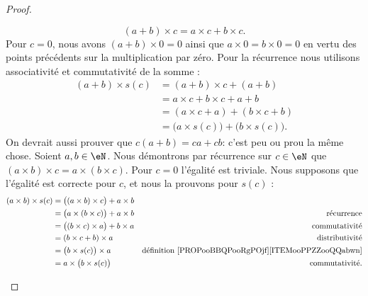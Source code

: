 \begin{proof}
\begin{subproof}
		\begin{equation}
			(a+b)\times c=a\times c+b\times c.
		\end{equation}
		Pour \( c=0\), nous avons \( (a+b)\times 0=0\) ainsi que \( a\times 0=b\times 0=0\) en vertu des points précédents sur la multiplication par zéro. Pour la récurrence nous utilisons associativité et commutativité de la somme :
		\begin{subequations}
			\begin{align}
				(a+b)\times s(c) & =(a+b)\times c+(a+b)                                \\
				                 & =a\times c+b\times c+a+b                            \\
				                 & =(a\times c +a)+(b\times c+b)                       \\
				                 & =\big( a\times s(c) \big)+\big( b\times s(c) \big).
			\end{align}
		\end{subequations}
		On devrait aussi prouver que \( c(a+b) = ca + cb \): c'est peu ou prou la même chose.
		Soient \( a,b\in \eN\). Nous démontrons par récurrence sur \( c\in \eN\) que \( (a\times b)\times c=a\times (b\times c)\). Pour \( c=0\) l'égalité est triviale. Nous supposons que l'égalité est correcte pour \( c\), et nous la prouvons pour \( s(c)\) :
		\begin{subequations}
			\begin{align}
				(a\times b)\times s(c) & =\big( (a\times b)\times c \big)+a\times b                                                                      \\
				                       & =\big( a\times (b\times c) \big)+a\times b & \text{récurrence}                                                  \\
				                       & =\big( (b\times c)\times a \big)+b\times a & \text{commutativité}                                               \\
				                       & =(b\times c+b)\times a                     & \text{distributivité}                                              \\
				                       & =\big( b\times s(c) \big)\times a          & \text{définition \ref{PROPooBBQPooRgPOjf}\ref{ITEMooPPZZooQQabwn}} \\
				                       & =a\times \big( b\times s(c) \big)          & \text{commutativité}.
			\end{align}
		\end{subequations}
	\end{subproof}
\end{proof}

